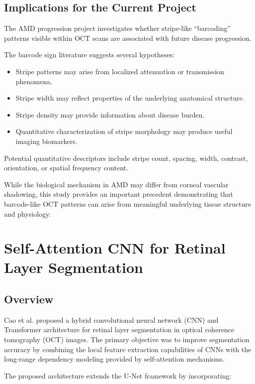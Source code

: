 \documentclass[11pt]{article}
\begin{document}
\subsection*{Implications for the Current Project}

The AMD progression project investigates whether stripe-like ``barcoding'' patterns visible within OCT scans are associated with future disease progression.

The barcode sign literature suggests several hypotheses:

\begin{itemize}
    \item Stripe patterns may arise from localized attenuation or transmission phenomena.
    \item Stripe width may reflect properties of the underlying anatomical structure.
    \item Stripe density may provide information about disease burden.
    \item Quantitative characterization of stripe morphology may produce useful imaging biomarkers.
\end{itemize}

Potential quantitative descriptors include stripe count, spacing, width, contrast, orientation, or spatial frequency content.

While the biological mechanism in AMD may differ from corneal vascular shadowing, this study provides an important precedent demonstrating that barcode-like OCT patterns can arise from meaningful underlying tissue structure and physiology.

\section{Self-Attention CNN for Retinal Layer Segmentation}

\subsection*{Overview}

Cao et al. proposed a hybrid convolutional neural network (CNN) and Transformer architecture for retinal layer segmentation in optical coherence tomography (OCT) images. The primary objective was to improve segmentation accuracy by combining the local feature extraction capabilities of CNNs with the long-range dependency modeling provided by self-attention mechanisms.

The proposed architecture extends the U-Net framework by incorporating:
\end{document}
